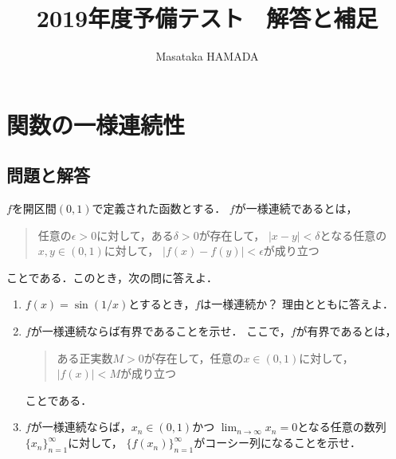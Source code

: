 \documentclass{jsarticle}
\title{2019年度予備テスト　解答と補足}
\author{Masataka HAMADA}
\theoremstyle{definition}
\begin{document}
\maketitle

\section{関数の一様連続性}
\subsection{問題と解答}

\begin{screen}
$f$を開区間$(0,1)$で定義された函数とする．
$f$が一様連続であるとは，
\begin{quote}
任意の$\epsilon>0$に対して，ある$\delta>0$が存在して，
$|x-y|<\delta$となる任意の$x,y\in(0,1)$に対して，
$|f(x)-f(y)|<\epsilon$が成り立つ
\end{quote}
ことである．このとき，次の問に答えよ．
\begin{enumerate}
\item$f(x)=\sin(1/x)$とするとき，$f$は一様連続か？
理由とともに答えよ．
\item$f$が一様連続ならば有界であることを示せ．
ここで，$f$が有界であるとは，
\begin{quote}
ある正実数$M>0$が存在して，任意の$x\in(0,1)$に対して，
$|f(x)|<M$が成り立つ
\end{quote}
ことである．
\item$f$が一様連続ならば，$x_n\in(0,1)$かつ
$\lim_{n\to\infty}x_n=0$となる任意の数列$\{x_n\}_{n=1}^\infty$に対して，
$\{f(x_n)\}_{n=1}^\infty$がコーシー列になることを示せ．
\end{enumerate}
\end{screen}
\end{document}
